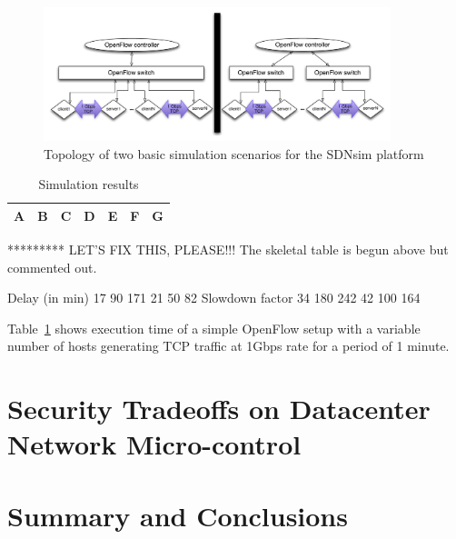 \begin{figure}
\includegraphics[width=0.9\textwidth]{sdnsim-topology}
\caption{Topology of two basic simulation scenarios for the SDNsim platform}
\label{Haris-Fig2}
\end{figure}

\begin{table}
\caption{Simulation results}
\label{Haris-Table1}
\begin{center}
\begin{tabular}{|l|c|c|c|c|c|c|} \hline
 A&B&C&D&E&F&G\\\hline
\end{tabular}
\end{center}
\end{table}

********* 
LET'S FIX THIS, PLEASE!!!  The skeletal table is begun above but commented out.

Delay (in min)
17
90
171
21
50
82
Slowdown factor
34
180
242
42
100
164

Table~\ref{Haris-Table1} shows execution time of a simple OpenFlow
setup with a variable number of hosts generating TCP traffic at 1Gbps
rate for a period of 1 minute.

\section{Security Tradeoffs on Datacenter Network Micro-control} \label{sec:rdsf-eval}

\section{Summary and Conclusions}\label{sec:conclusion}
  
